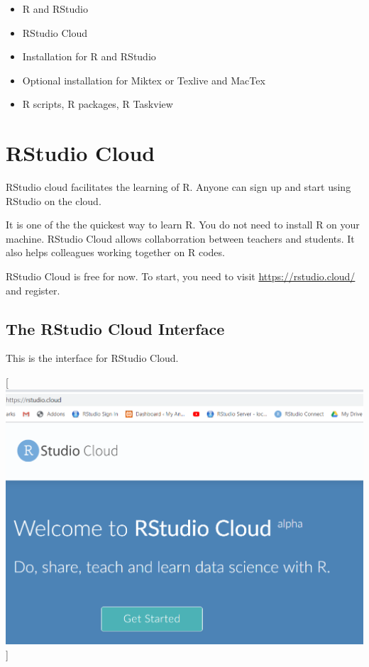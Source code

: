 \documentclass[
]{book}
\providecommand{\tightlist}{%
  \setlength{\itemsep}{0pt}\setlength{\parskip}{0pt}}
\begin{document}
\begin{itemize}
\tightlist
\item
  R and RStudio
\item
  RStudio Cloud
\item
  Installation for R and RStudio
\item
  Optional installation for Miktex or Texlive and MacTex\\
\item
  R scripts, R packages, R Taskview
\end{itemize}

\hypertarget{rstudio-cloud}{%
\section{RStudio Cloud}\label{rstudio-cloud}}

RStudio cloud facilitates the learning of R. Anyone can sign up and start using RStudio on the cloud.

It is one of the the quickest way to learn R. You do not need to install R on your machine. RStudio Cloud allows collaborration between teachers and students. It also helps colleagues working together on R codes.

RStudio Cloud is free for now. To start, you need to visit \url{https://rstudio.cloud/} and register.

\hypertarget{the-rstudio-cloud-interface}{%
\subsection{The RStudio Cloud Interface}\label{the-rstudio-cloud-interface}}

This is the interface for RStudio Cloud.

{[}\includegraphics{cloud.PNG}{]}
\end{document}
